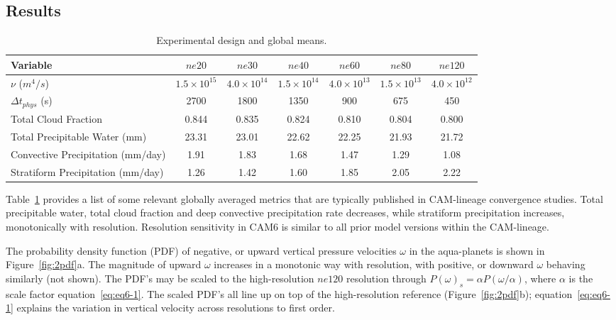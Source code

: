 \subsection{Results}

 \begin{table}
 \caption{Experimental design and global means.}
 \centering
 \scriptsize
 \begin{tabular}{lcccccc}
   \hline
   Variable & $ne20$ & $ne30$ & $ne40$ & $ne60$ & $ne80$ & $ne120$ \\
   \hline
   $\nu$ ($m^4/s$) & $1.5 \times 10^{15}$ & $4.0 \times 10^{14}$ & $1.5 \times 10^{14}$ & $4.0 \times 10^{13}$  & $1.5 \times 10^{13}$ & $4.0 \times 10^{12}$\\
    $\Delta t_{phys}$ (s) & 2700 & 1800 & 1350 & 900 & 675 & 450 \\
   Total Cloud Fraction & 0.844 & 0.835 & 0.824 & 0.810 & 0.804 & 0.800 \\ 
   Total Precipitable Water (mm) & 23.31& 23.01 & 22.62 & 22.25 & 21.93 & 21.72 \\
   Convective Precipitation (mm/day) & 1.91 & 1.83 & 1.68 & 1.47 & 1.29 & 1.08 \\
   Stratiform Precipitation (mm/day) & 1.26 & 1.42 & 1.60 & 1.85 & 2.05 & 2.22 \\      
 \hline
 \end{tabular}
 \label{tbl:table6-1}
 \end{table}

Table~\ref{tbl:table6-1} provides a list of some relevant globally averaged metrics that are typically published in CAM-lineage convergence studies. Total precipitable water, total cloud fraction and deep convective precipitation rate decreases, while stratiform precipitation increases, monotonically with resolution. Resolution sensitivity in CAM6 is similar to all prior model versions within the CAM-lineage. 

The probability density function (PDF) of negative, or upward vertical pressure velocities $\omega$ in the aqua-planets is shown in Figure~\ref{fig:2pdf}a. The magnitude of upward $\omega$ increases in a monotonic way with resolution, with positive, or downward $\omega$ behaving similarly (not shown). The PDF's may be scaled to the high-resolution $ne120$ resolution through $P(\omega)_s = \alpha P (\omega / \alpha)$, where $\alpha$ is the scale factor equation~\ref{eq:eq6-1}. The scaled PDF's all line up on top of the high-resolution reference (Figure~\ref{fig:2pdf}b); equation~\ref{eq:eq6-1} explains the variation in vertical velocity across resolutions to first order. 

